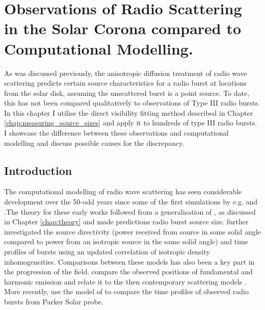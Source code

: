 \doublespacing
\chapter{Observations of Radio Scattering in the Solar Corona compared to Computational Modelling.}
\label{chap:observations_vs_theory}
As was discussed previously, the anisotropic diffusion treatment of radio wave scattering predicts certain source characteristics for a radio burst at locations from the solar disk, assuming the unscattered burst is a point source. To date, this has not been compared qualitatively to observations of Type III radio bursts. In this chapter I utilise the direct visibility fitting method described in Chapter \ref{chap:measuring_source_sizes} and apply it to hundreds of type III radio bursts. I showcase the difference between these observations and computational modelling and discuss possible causes for the discrepancy.

\section{Introduction}
\label{sec:obsvtheory_intro}
The computational modelling of radio wave scattering has seen considerable development over the 50-odd years since some of the first simulations by e.g. \cite{ Fokker1965} and \cite{Steinberg1971}.The theory for these early works followed from a generalisation of \cite{Chandrasekhar1952}, as discussed in Chapter \ref{chap:theory} and made predictions radio burst source size. \cite{Thejappa2007} further investigated the source directivity (power received from source in some solid angle compared to power from an isotropic source in the same solid angle) and time profiles of bursts using an updated correlation of isotropic density inhomogeneities. Comparisons between these models has also been a key part in the progression of the field. \cite{Stewart1972} compare the observed positions of fundamental and harmonic emission and relate it to the then contemporary scattering models \citep[e.g.][]{Fokker1965,Steinberg1971,Riddle1974}. More recently, \cite{Krupar2020} use the model of \cite{Thejappa2007} to compare the time profiles of observed radio bursts from Parker Solar probe.

